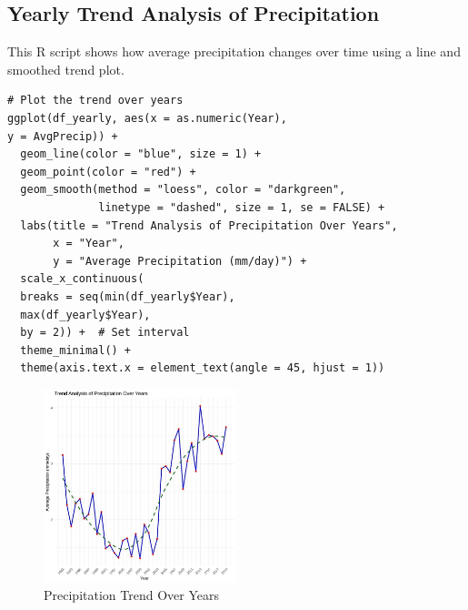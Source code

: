 \subsection*{Yearly Trend Analysis of Precipitation}

This R script shows how average precipitation changes over time using a line and smoothed trend plot.

\begin{verbatim}
# Plot the trend over years
ggplot(df_yearly, aes(x = as.numeric(Year),
y = AvgPrecip)) +
  geom_line(color = "blue", size = 1) +    
  geom_point(color = "red") +           
  geom_smooth(method = "loess", color = "darkgreen", 
              linetype = "dashed", size = 1, se = FALSE) +  
  labs(title = "Trend Analysis of Precipitation Over Years",
       x = "Year",
       y = "Average Precipitation (mm/day)") +
  scale_x_continuous(
  breaks = seq(min(df_yearly$Year),
  max(df_yearly$Year), 
  by = 2)) +  # Set interval
  theme_minimal() +
  theme(axis.text.x = element_text(angle = 45, hjust = 1))
\end{verbatim}

\begin{figure}[h]
\centering
\includegraphics[width=0.5\textwidth]{figures/precip_trend.jpg}
\caption{Precipitation Trend Over Years}
\end{figure}
